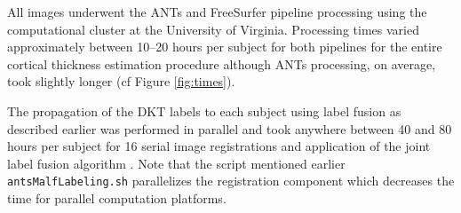 All images underwent the ANTs and FreeSurfer pipeline processing 
using the computational cluster at the University of Virginia.  
Processing times varied approximately between 10--20 hours per subject
for both pipelines for the entire cortical thickness estimation procedure
although ANTs processing, on average, took slightly longer (cf Figure \ref{fig:times}).

The propagation of the DKT labels to each subject using label fusion as described earlier
was performed in parallel and took anywhere between 40 and 80 hours per 
subject for 16 serial image registrations and application of the joint label fusion algorithm \citep{wang2013}. 
Note that the script mentioned earlier {\tt antsMalfLabeling.sh} parallelizes
the registration component which decreases the time for parallel computation platforms.
 
 
 

